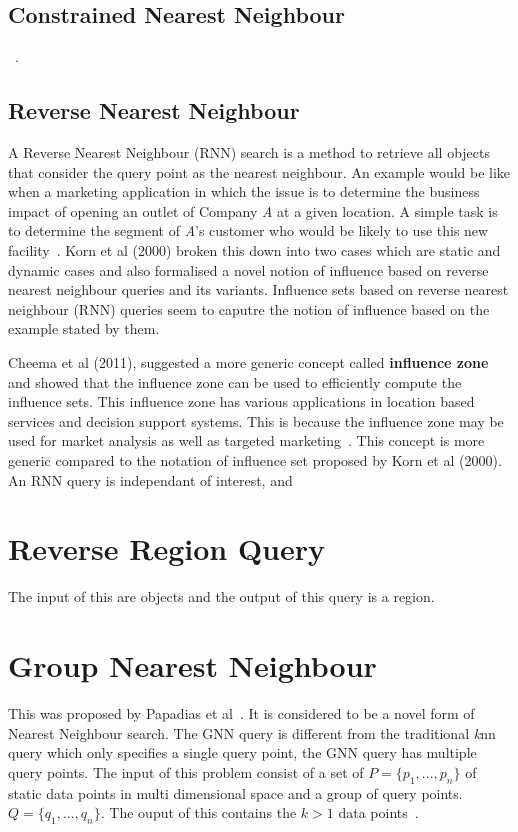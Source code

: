 \documentclass[a4paper,11pt]{article}
\begin{document}
\subsection{Constrained Nearest Neighbour}

~\cite{ferhatosmanoglu2001constrained}.

\subsection{Reverse Nearest Neighbour}

A Reverse Nearest Neighbour (RNN) search is a method to retrieve all objects that consider the query point as the nearest neighbour. An example would be like when a marketing application in which the issue is to determine the business impact of opening an outlet of Company \textit{A} at a given location. A simple task is to determine the segment of \textit{A}'s customer who would be likely to use this new facility~\cite{korn2000influence}. Korn et al (2000) broken this down into two cases which are static and dynamic cases and also formalised a novel notion of influence based on reverse nearest neighbour queries and its variants. Influence sets based on reverse nearest neighbour (RNN) queries seem to caputre the notion of influence based on the example stated by them.

Cheema et al (2011), suggested a more generic concept called \textbf{influence zone} and showed that the influence zone can be used to efficiently compute the influence sets. This influence zone has various applications in location based services and decision support systems. This is because the influence zone may be used for market analysis as well as targeted marketing~\cite{cheema2011influence}. This concept is more generic compared to the notation of influence set proposed by Korn et al (2000). An RNN query is independant of interest, and 

\section{Reverse Region Query}

The input of this are objects and the output of this query is a region. 

\section{Group Nearest Neighbour} 

This was proposed by Papadias et al~\cite{papadias2004group}. It is considered to be a novel form of Nearest Neighbour search. The GNN query is different from the traditional \textit{k}nn query which only specifies a single query point, the GNN query has multiple query points. The input of this problem consist of  a set of $P=\{p_1,...,p_n\}$ of static data points in multi dimensional space and a group of query points. $Q=\{q_1,...,q_n\}$. The ouput of this contains the $k>1$ data points~\cite{papadias2004group}. 
\end{document}
